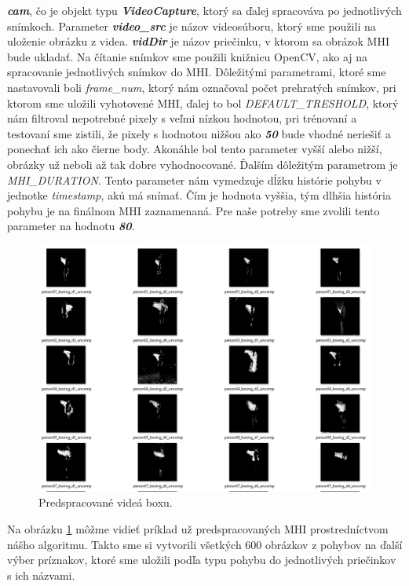  \textbf{\textit{cam}}, čo je objekt typu \textbf{\textit{VideoCapture}}, ktorý sa ďalej spracováva po jednotlivých snímkoch. 
 Parameter \textbf{\textit{video\_src}} je názov videosúboru, ktorý sme použili na uloženie obrázku z videa.
 \textbf{\textit{vidDir}} je názov priečinku, v ktorom sa obrázok MHI bude ukladať. 
 Na čítanie snímkov sme použili knižnicu OpenCV, ako aj na spracovanie jednotlivých snímkov do MHI. Dôležitými parametrami, ktoré sme nastavovali boli \textit{frame\_num}, ktorý nám označoval počet prehratých snímkov, pri ktorom sme uložili vyhotovené MHI, ďalej to bol \textit{DEFAULT\_TRESHOLD}, ktorý nám filtroval nepotrebné pixely s veľmi nízkou hodnotou, pri trénovaní a testovaní sme zistili, že pixely s hodnotou nižšou ako \textit{\textbf{50}} bude vhodné neriešiť a ponechať ich ako čierne body. Akonáhle bol tento parameter vyšší alebo nižší, obrázky už neboli až tak dobre vyhodnocované. Ďalším dôležitým parametrom je \textit{MHI\_DURATION}. Tento parameter nám vymedzuje dĺžku histórie pohybu v jednotke \textit{timestamp}, akú má snímať. Čím je hodnota vyššia, tým dlhšia história pohybu je na finálnom MHI zaznamenaná. 
 Pre naše potreby sme zvolili tento parameter na hodnotu \textit{\textbf{80}}.

\begin{figure}[H]
  \centering
  \includegraphics[width=15cm]{img/MHIbox.png}
  \caption{Predspracované videá boxu.}
  \label{MHIbox}
\end{figure}  

Na obrázku \ref{MHIbox} môžme vidieť príklad už predspracovaných MHI prostredníctvom nášho algoritmu. Takto sme si vytvorili všetkých 600 obrázkov z pohybov na ďalší výber príznakov, ktoré sme uložili podľa typu pohybu do jednotlivých priečinkov s ich názvami. 

